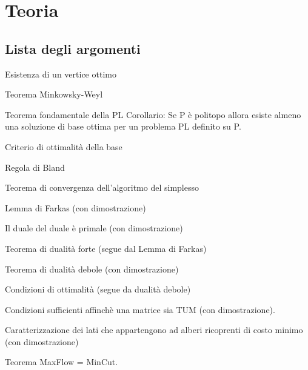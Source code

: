 \documentclass[\main/main.tex]{subfiles}
\begin{document}
\chapter{Teoria}

\section{Lista degli argomenti}
\begin{todolist}
  \item Esistenza di un vertice ottimo
  \item Teorema Minkowsky-Weyl
  \item Teorema fondamentale della PL
  \subitem Corollario: Se P è politopo allora esiste almeno una soluzione di base ottima per un problema PL definito su P.
  \item Criterio di ottimalità della base
  \item Regola di Bland
  \item Teorema di convergenza dell'algoritmo del simplesso
  \item Lemma di Farkas (con dimostrazione)
  \item Il duale del duale è primale (con dimostrazione)
  \item Teorema di dualità forte (segue dal Lemma di Farkas)
  \item Teorema di dualità debole (con dimostrazione)
  \item Condizioni di ottimalità (segue da dualità debole)
  \item Condizioni sufficienti affinchè una matrice sia TUM (con dimostrazione).
  \item Caratterizzazione dei lati che appartengono ad alberi ricoprenti di costo minimo (con dimostrazione)
  \item Teorema MaxFlow = MinCut.
\end{todolist}





\clearpage


\clearpage





\clearpage



\end{document}
